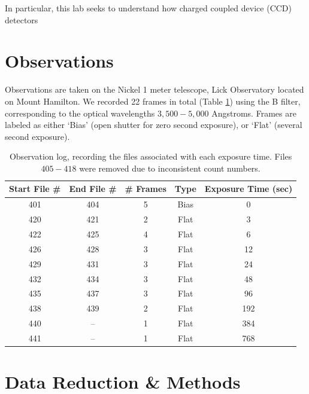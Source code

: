 \documentclass[preprint]{aastex62}
\begin{document}
In particular, this lab seeks to understand how charged coupled device (CCD) detectors 

\section{Observations}
Observations are taken on the Nickel 1 meter telescope, Lick Observatory located on Mount Hamilton. We recorded 22 frames in total (Table \ref{table:log}) using the B filter, corresponding to the optical wavelengths $3,500-5,000$ Angstroms. Frames are labeled as either `Bias' (open shutter for zero second exposure), or `Flat' (several second exposure).

\begin{table}[H]
\centering
\begin{tabular}{|c|c|c|c|c|}
    \hline
    Start File \# & End File \# & \# Frames & Type  & Exposure Time (sec) \\
    \hline
    \hline
    401 & 404 & 5 & Bias & 0  \\
    420 & 421 & 2 & Flat & 3 \\
    422 & 425 & 4 & Flat & 6 \\
    426 & 428 & 3 & Flat & 12 \\
    429 & 431 & 3 & Flat & 24 \\
    432 & 434 & 3 & Flat & 48 \\
    435 & 437 & 3 & Flat & 96 \\
    438 & 439 & 2 & Flat & 192 \\
    440 & --  & 1 & Flat & 384 \\
    441 & --  & 1 & Flat & 768 \\
    \hline
\end{tabular}
\caption{Observation log, recording the files associated with each exposure time. Files $405-418$ were removed due to inconsistent count numbers.} \label{table:log}
\end{table}


\section{Data Reduction \& Methods}
\end{document}

